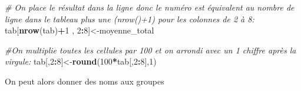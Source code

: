 \documentclass[
]{book}
\newenvironment{Shaded}{\begin{snugshade}}{\end{snugshade}}
\newcommand{\AttributeTok}[1]{\textcolor[rgb]{0.13,0.29,0.53}{#1}}
\newcommand{\CommentTok}[1]{\textcolor[rgb]{0.56,0.35,0.01}{\textit{#1}}}
\newcommand{\DecValTok}[1]{\textcolor[rgb]{0.00,0.00,0.81}{#1}}
\newcommand{\FunctionTok}[1]{\textcolor[rgb]{0.13,0.29,0.53}{\textbf{#1}}}
\newcommand{\NormalTok}[1]{#1}
\newcommand{\OtherTok}[1]{\textcolor[rgb]{0.56,0.35,0.01}{#1}}
\newcommand{\SpecialCharTok}[1]{\textcolor[rgb]{0.81,0.36,0.00}{\textbf{#1}}}
\newcommand{\StringTok}[1]{\textcolor[rgb]{0.31,0.60,0.02}{#1}}
\begin{document}
\begin{Shaded}
\begin{Highlighting}[]
\CommentTok{\# On place le résultat dans la ligne donc le numéro est équivalent au nombre de ligne dans le tableau plus une (nrow()+1) pour les colonnes de 2 à 8:}
\NormalTok{tab[}\FunctionTok{nrow}\NormalTok{(tab)}\SpecialCharTok{+}\DecValTok{1}\NormalTok{ ,  }\DecValTok{2}\SpecialCharTok{:}\DecValTok{8}\NormalTok{]}\OtherTok{\textless{}{-}}\NormalTok{moyenne\_total}

\CommentTok{\#On multiplie toutes les cellules par 100 et on arrondi avec un 1 chiffre après la virgule:}
\NormalTok{tab[,}\DecValTok{2}\SpecialCharTok{:}\DecValTok{8}\NormalTok{]}\OtherTok{\textless{}{-}}\FunctionTok{round}\NormalTok{(}\DecValTok{100}\SpecialCharTok{*}\NormalTok{tab[,}\DecValTok{2}\SpecialCharTok{:}\DecValTok{8}\NormalTok{],}\DecValTok{1}\NormalTok{)}
\end{Highlighting}
\end{Shaded}

On peut alors donner des noms aux groupes

\begin{Shaded}
\end{Shaded}
\end{document}
